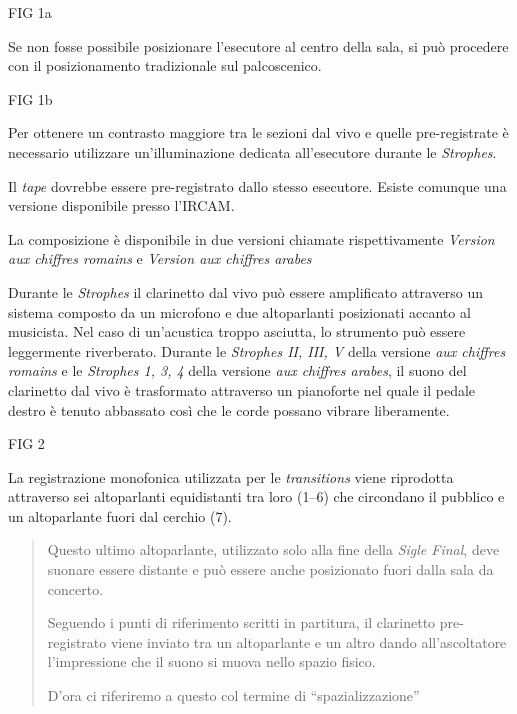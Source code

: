 FIG 1a

Se non fosse possibile posizionare l'esecutore al centro della sala, si può procedere con il posizionamento tradizionale sul palcoscenico.

FIG 1b

Per ottenere un contrasto maggiore tra le sezioni dal vivo e quelle pre-registrate è necessario utilizzare un'illuminazione dedicata all'esecutore durante le \emph{Strophes}.

Il \emph{tape} dovrebbe essere pre-registrato dallo stesso esecutore. Esiste comunque una versione disponibile presso l'IRCAM.

La composizione è disponibile in due versioni chiamate rispettivamente \emph{Version aux chiffres romains} e \emph{Version aux chiffres arabes}


Durante le \emph{Strophes} il clarinetto dal vivo può essere amplificato attraverso un sistema composto da un microfono e due altoparlanti posizionati accanto al musicista. Nel caso di un'acustica troppo asciutta, lo strumento può essere leggermente riverberato. Durante le \emph{Strophes II, III, V} della versione \emph{aux chiffres romains} e le \emph{Strophes 1, 3, 4} della versione \emph{aux chiffres arabes}, il suono del clarinetto dal vivo è trasformato attraverso un pianoforte nel quale il pedale destro è tenuto abbassato così che le corde possano vibrare liberamente.

FIG 2


La registrazione monofonica utilizzata per le \emph{transitions} viene riprodotta attraverso sei altoparlanti equidistanti tra loro (1--6) che circondano il pubblico e un altoparlante fuori dal cerchio (7).

\begin{quote}
{\small
Questo ultimo altoparlante, utilizzato solo alla fine della \emph{Sigle Final}, deve suonare essere distante e può essere anche posizionato fuori dalla sala da concerto.


Seguendo i punti di riferimento scritti in partitura, il clarinetto pre-registrato viene inviato tra un altoparlante e un altro dando all'ascoltatore l'impressione che il suono si muova nello spazio fisico.

D'ora ci riferiremo a questo col termine di “spazializzazione”
}

\end{quote}

